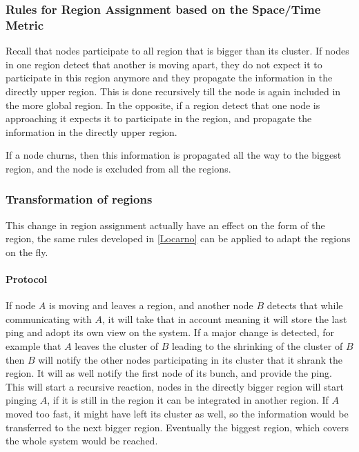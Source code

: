 \documentclass[a4paper,11pt,oneside]{report}
\begin{document}
\subsubsection{Rules for Region Assignment based on the Space/Time Metric}
Recall that nodes participate to all region that is bigger than its cluster. If
nodes in one region detect that another is moving apart, they do not expect it
to participate in this region anymore and they propagate the information in the
directly upper region. This is done recursively till the node is again included
in the more global region.  In the opposite, if a region detect that one node
is approaching it expects it to participate in the region, and propagate the
information in the directly upper region.

If a node churns, then this information is propagated all the way to the
biggest region, and the node is excluded from all the regions. 

\subsubsection{Transformation of regions}
This change in region assignment actually have an effect on the form of the
region, the same rules developed in \ref{Locarno} can be applied to adapt the
regions on the fly. 

\paragraph{Protocol}
If node $A$ is moving and leaves a region, and another node $B$ detects that
while communicating with $A$, it will take that in account meaning it will
store the last ping and adopt its own view on the system. If a major change is
detected, for example that $A$ leaves the cluster of $B$ leading to the
shrinking of the cluster of $B$ then $B$ will notify the other nodes
participating in its cluster that it shrank the region. It will as well notify
the first node of its bunch, and provide the ping. This will start a recursive
reaction, nodes in the directly bigger region will start pinging $A$, if it is
still in the region it can be integrated in another region. If $A$ moved too
fast, it might have left its cluster as well, so the information would be
transferred to the next bigger region. Eventually the biggest region, which
covers the whole system would be reached. 
\end{document}
